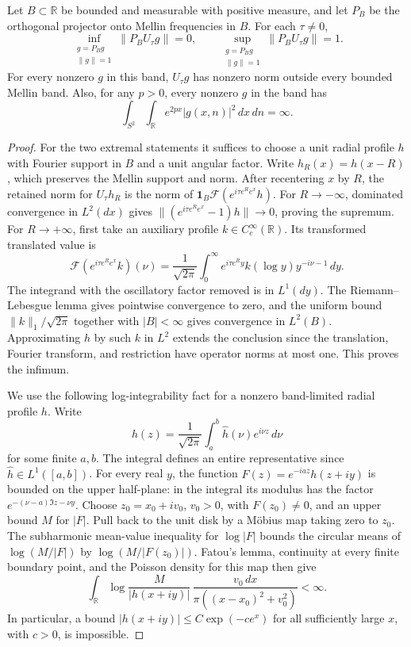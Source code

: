 \begin{theorem}
\label{thm:mellintranslation}
Let $B\subset\mathbb R$ be bounded and measurable with positive
measure, and let $P_B$ be the orthogonal projector onto Mellin
frequencies in $B$. For each $\tau\ne0$,
\[
 \inf_{\substack{g=P_Bg\\ \|g\|=1}}\|P_BU_\tau g\|=0,
 \qquad
 \sup_{\substack{g=P_Bg\\ \|g\|=1}}\|P_BU_\tau g\|=1.
\]
For every nonzero $g$ in this band, $U_\tau g$ has nonzero norm
outside every bounded Mellin band. Also, for any $p>0$, every
nonzero $g$ in the band has
\[
 \int_{S^2}\int_{\mathbb R}e^{2px}|g(x,n)|^2\,dx\,dn=\infty.
\]
\end{theorem}
\begin{proof}
For the two extremal statements it suffices to choose a unit radial
profile $h$ with Fourier support in $B$ and a unit angular factor.
Write $h_R(x)=h(x-R)$, which preserves the Mellin support and norm.
After recentering $x$ by $R$, the retained norm for $U_\tau h_R$
is the norm of $\mathbf1_B\mathcal F(e^{i\tau e^R e^x}h)$.
For $R\to-\infty$, dominated convergence in $L^2(dx)$ gives
$\|(e^{i\tau e^R e^x}-1)h\|\to 0$, proving the supremum.
For $R\to+\infty$, first take an auxiliary profile $k\in C_c^\infty(\mathbb R)$.
Its transformed translated value is
\[
 \mathcal F(e^{i\tau e^R e^x}k)(\nu)
 =\frac1{\sqrt{2\pi}}\int_0^\infty
         e^{i\tau e^R y}k(\log y)y^{-i\nu-1}\,dy.
\]
The integrand with the oscillatory factor removed is in $L^1(dy)$.
The Riemann--Lebesgue lemma gives pointwise convergence to zero,
and the uniform bound $\|k\|_1/\sqrt{2\pi}$ together with
$|B|<\infty$ gives convergence in $L^2(B)$. Approximating $h$ by
such $k$ in $L^2$ extends the conclusion since the translation,
Fourier transform, and restriction have operator norms at most
one. This proves the infimum.

We use the following log-integrability fact for a nonzero
band-limited radial profile $h$. Write
\[
 h(z)=\frac1{\sqrt{2\pi}}\int_a^b \widehat h(\nu)e^{i\nu z}\,d\nu
\]
for some finite $a,b$. The integral defines an entire
representative since $\widehat h\in L^1([a,b])$.
For every real $y$, the function $F(z)=e^{-iaz}h(z+iy)$ is
bounded on the upper half-plane: in the integral its modulus
has the factor $e^{-(\nu-a)\Im z-\nu y}$. Choose
$z_0=x_0+iv_0$, $v_0>0$, with $F(z_0)\ne0$, and an upper
bound $M$ for $|F|$. Pull back to the unit disk by a
M\"obius map taking zero to $z_0$. The subharmonic mean-value
inequality for $\log|F|$ bounds the circular means of
$\log(M/|F|)$ by $\log(M/|F(z_0)|)$. Fatou's lemma,
continuity at every finite boundary point, and the Poisson
density for this map then give
\[
 \int_{\mathbb R}\log\frac{M}{|h(x+iy)|}\,
      \frac{v_0\,dx}{\pi((x-x_0)^2+v_0^2)}<\infty.
 \tag{*}\label{eq:bandlogintegrability}
\]
In particular, a bound $|h(x+iy)|\le C\exp(-ce^x)$
for all sufficiently large $x$, with $c>0$, is impossible.


\end{proof}

